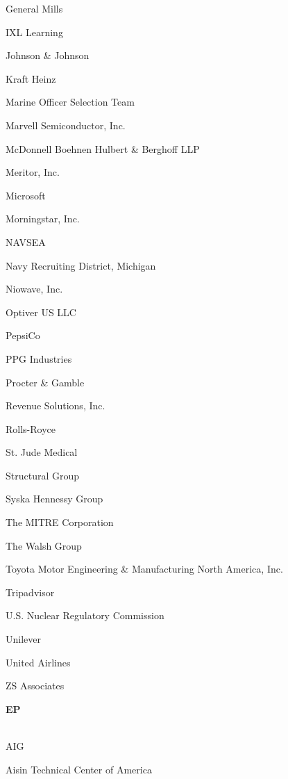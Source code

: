 \documentclass[twoside]{article}
\begin{document}
\begin{center}
\begin{multicols}{5}
\begin{FlushLeft}
\begin{compactitem}
\item General Mills
\item IXL Learning
\item Johnson \& Johnson
\item Kraft Heinz
\item Marine Officer Selection Team
\item Marvell Semiconductor, Inc.
\item McDonnell Boehnen Hulbert \& Berghoff LLP
\item Meritor, Inc.
\item Microsoft
\item Morningstar, Inc.
\item NAVSEA
\item Navy Recruiting District, Michigan
\item Niowave, Inc.
\item Optiver US LLC
\item PepsiCo
\item PPG Industries
\item Procter \& Gamble
\item Revenue Solutions, Inc.
\item Rolls-Royce
\item St. Jude Medical
\item Structural Group
\item Syska Hennessy Group
\item The MITRE Corporation
\item The Walsh Group
\item Toyota Motor Engineering \& Manufacturing North America, Inc.
\item Tripadvisor
\item U.S. Nuclear Regulatory Commission
\item Unilever
\item United Airlines
\item ZS Associates
\end{compactitem}
        \end{FlushLeft}
        \vspace{1em}
        {\fontsize{14}{16}\selectfont \bf EP}\\
        \vspace{-1em}
        ~\hrulefill~
        \vspace{-.9em}
        \begin{FlushLeft}
        \begin{compactitem}
        \item AIG
\item Aisin Technical Center of America

\end{compactitem}
\end{FlushLeft}
\end{multicols}
\end{center}
\end{document}
